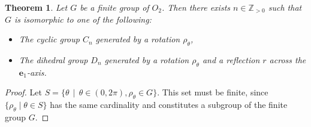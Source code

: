 \documentclass[11pt]{article}
\renewcommand{\vec}[1]{\mathbf{#1}}
\newtheorem{theorem}{Theorem}
\begin{document}
\begin{adjustwidth}{1cm}{}
	\begin{theorem}
		Let $G$ be a finite group of $O_{2}$. Then there exists $n \in \mathbb{Z}_{> 0}$ such that $G$ is isomorphic to one of the following:
		\begin{itemize}
			\item The cyclic group $C_{n}$ generated by a rotation $\rho_{\theta}$,
			\item The dihedral group $D_{n}$ generated by a rotation $\rho_{\theta}$ and a reflection $r$ across the $\vec{e}_{1}$-axis.
		\end{itemize}
	\end{theorem}
	\begin{proof}
		Let $S = \{ \theta \, \mid \, \theta \in (0, 2\pi), \rho_{\theta} \in G \}$. This set must be finite, since $\{ \rho_{\theta} \mid \theta \in S \}$ has the same cardinality and constitutes a subgroup of the finite group $G$.


\end{proof}
\end{adjustwidth}
\end{document}
